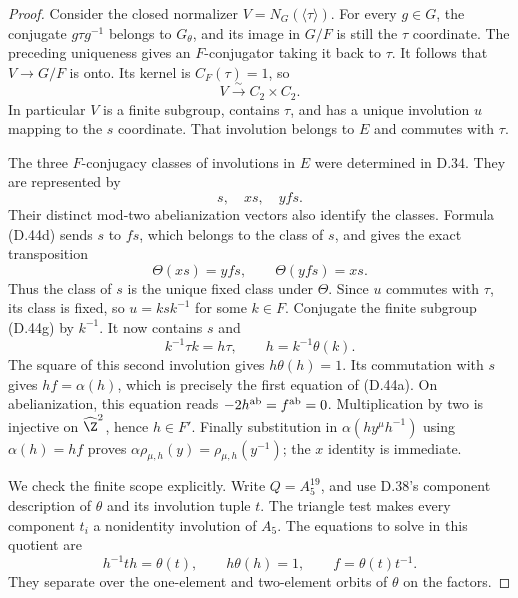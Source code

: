 \begin{proof}
Consider the closed normalizer
$V=N_G(\langle\tau\rangle)$.
For every $g\in G$, the conjugate $g\tau g^{-1}$
belongs to $G_\theta$, and its image in
$G/F$ is still the $\tau$ coordinate.
The preceding uniqueness gives an $F$-conjugator
taking it back to $\tau$.
It follows that $V\to G/F$ is onto.
Its kernel is $C_F(\tau)=1$, so
\[
                   V\xrightarrow{\sim}C_2\times C_2.
                                                        \tag{D.44g}
\]
In particular $V$ is a finite subgroup,
contains $\tau$, and has a unique involution
$u$ mapping to the $s$ coordinate.
That involution belongs to $E$ and commutes
with $\tau$.

The three $F$-conjugacy classes of involutions
in $E$ were determined in D.34.  They are
represented by
\[
                            s,\quad xs,\quad yfs.
                                                        \tag{D.44h}
\]
Their distinct mod-two abelianization vectors
also identify the classes.
Formula (D.44d) sends $s$ to $fs$, which
belongs to the class of $s$, and gives the
exact transposition
\[
                      \Theta(xs)=yfs,\qquad
                      \Theta(yfs)=xs.
                                                        \tag{D.44i}
\]
Thus the class of $s$ is the unique fixed
class under $\Theta$.
Since $u$ commutes with $\tau$, its class
is fixed, so $u=ksk^{-1}$ for some $k\in F$.
Conjugate the finite subgroup (D.44g)
by $k^{-1}$.
It now contains $s$ and
\[
                k^{-1}\tau k=h\tau,\qquad
                              h=k^{-1}\theta(k).
                                                        \tag{D.44j}
\]
The square of this second involution gives
$h\theta(h)=1$.
Its commutation with $s$ gives
$hf=\alpha(h)$, which is precisely the
first equation of (D.44a).
On abelianization, this equation reads
$-2h^{\rm ab}=f^{\rm ab}=0$.
Multiplication by two is injective on
$\widehat\Z^2$, hence $h\in F'$.
Finally substitution in $\alpha(hy^\mu h^{-1})$
using $\alpha(h)=hf$ proves
$\alpha\rho_{\mu,h}(y)=\rho_{\mu,h}(y^{-1})$; the
$x$ identity is immediate.

We check the finite scope explicitly.
Write $Q=A_5^{19}$, and use D.38's component
description of $\theta$ and its involution tuple
$t$.  The triangle test makes every component
$t_i$ a nonidentity involution of $A_5$.
The equations to solve in this quotient are
\[
 h^{-1}t h=\theta(t),\qquad h\theta(h)=1,
       \qquad f=\theta(t)t^{-1}.
                                                        \tag{D.44k}
\]
They separate over the one-element and
two-element orbits of $\theta$ on the factors.


\end{proof}
